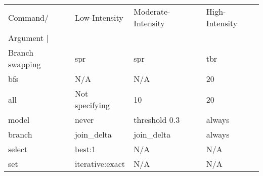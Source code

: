 \begin{center}
\begin{tabular}{| l  l  l p{}|}
	\hline
	Command/ & Low-Intensity & Moderate-Intensity & High-Intensity \\ 
	Argument | \\\hline \hline
	Branch swapping & spr & spr & tbr \\
	bfs & N/A & N/A & 20 \\
	all & Not specifying & 10 & 20 \\
	model & never & threshold 0.3 & always \\
	branch & join\_delta & join\_delta & always \\
	select & best:1 & N/A & N/A \\
	set & iterative:exact & N/A & N/A \\
	\hline	
\end{tabular}
\end{center}









